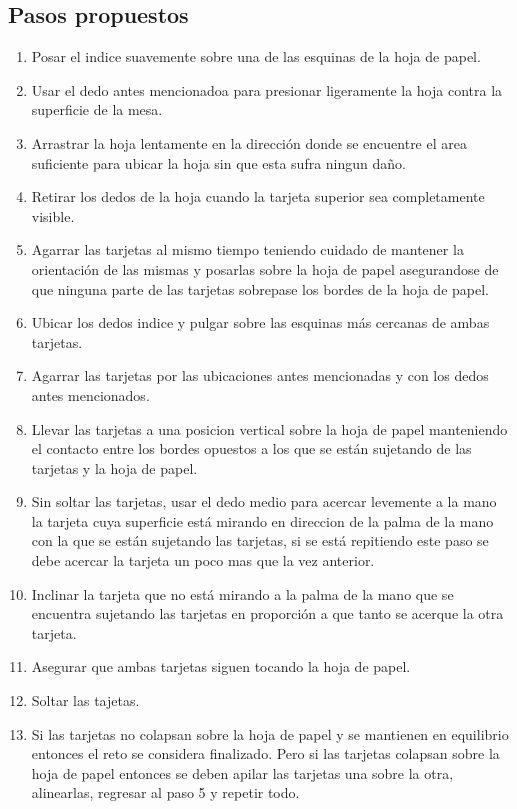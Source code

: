 \documentclass{article}
\begin{document}
\subsection{Pasos propuestos}
%
\begin{enumerate}
    \item Posar el indice suavemente sobre una de las esquinas de la hoja de papel.
    \item Usar el dedo antes mencionadoa para presionar ligeramente la hoja contra la superficie de la mesa.
    \item Arrastrar la hoja lentamente en la dirección donde se encuentre el area suficiente para ubicar la hoja sin que esta sufra ningun daño.
    \item Retirar los dedos de la hoja cuando la tarjeta superior sea completamente visible.
    \item Agarrar las tarjetas al mismo tiempo teniendo cuidado de mantener la orientación de las mismas y posarlas sobre la hoja de papel asegurandose de que ninguna parte de las tarjetas sobrepase los bordes de la hoja de papel.
    \item Ubicar los dedos indice y pulgar sobre las esquinas más cercanas de ambas tarjetas.
    \item Agarrar las tarjetas por las ubicaciones antes mencionadas y con los dedos antes mencionados.
    \item Llevar las tarjetas a una posicion vertical sobre la hoja de papel manteniendo el contacto entre los bordes opuestos a los que se están sujetando de las tarjetas y la hoja de papel.
    \item Sin soltar las tarjetas, usar el dedo medio para acercar levemente a la mano la tarjeta cuya superficie está mirando en direccion de la palma de la mano con la que se están sujetando las tarjetas, si se está repitiendo este paso se debe acercar la tarjeta un poco mas que la vez anterior.
    \item Inclinar la tarjeta que no está mirando a la palma de la mano que se encuentra sujetando las tarjetas en proporción a que tanto se acerque la otra tarjeta. 
    \item Asegurar que ambas tarjetas siguen tocando la hoja de papel.
    \item Soltar las tajetas.
    \item Si las tarjetas no colapsan sobre la hoja de papel y se mantienen en equilibrio entonces el reto se considera finalizado. Pero si las tarjetas colapsan sobre la hoja de papel entonces se deben apilar las tarjetas una sobre la otra, alinearlas, regresar al paso 5 y repetir todo.
\end{enumerate}
\end{document}
